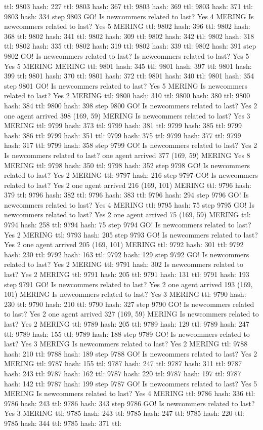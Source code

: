 ttl: 9803 hash: 227 ttl: 9803 hash: 367 ttl: 9803 hash: 369 ttl: 9803 hash: 371 ttl: 9803 hash: 334 step 9803 GO! Is newcommers related to last? Yes 4 MERING Is newcommers related to last? Yes 5 MERING ttl: 9802 hash: 396 ttl: 9802 hash: 368 ttl: 9802 hash: 341 ttl: 9802 hash: 309 ttl: 9802 hash: 342 ttl: 9802 hash: 318 ttl: 9802 hash: 335 ttl: 9802 hash: 319 ttl: 9802 hash: 339 ttl: 9802 hash: 391 step 9802 GO! Is newcommers related to last? Is newcommers related to last? Yes 5 Yes 5 MERING MERING ttl: 9801 hash: 345 ttl: 9801 hash: 397 ttl: 9801 hash: 399 ttl: 9801 hash: 370 ttl: 9801 hash: 372 ttl: 9801 hash: 340 ttl: 9801 hash: 354 step 9801 GO! Is newcommers related to last? Yes 5 MERING Is newcommers related to last? Yes 2 MERING ttl: 9800 hash: 310 ttl: 9800 hash: 380 ttl: 9800 hash: 384 ttl: 9800 hash: 398 step 9800 GO! Is newcommers related to last? Yes 2 one agent arrived 398 (169, 59) MERING Is newcommers related to last? Yes 3 MERING ttl: 9799 hash: 373 ttl: 9799 hash: 381 ttl: 9799 hash: 385 ttl: 9799 hash: 386 ttl: 9799 hash: 351 ttl: 9799 hash: 375 ttl: 9799 hash: 377 ttl: 9799 hash: 317 ttl: 9799 hash: 358 step 9799 GO! Is newcommers related to last? Yes 2 Is newcommers related to last? one agent arrived 377 (169, 59) MERING Yes 8 MERING ttl: 9798 hash: 350 ttl: 9798 hash: 352 step 9798 GO! Is newcommers related to last? Yes 2 MERING ttl: 9797 hash: 216 step 9797 GO! Is newcommers related to last? Yes 2 one agent arrived 216 (169, 101) MERING ttl: 9796 hash: 379 ttl: 9796 hash: 382 ttl: 9796 hash: 383 ttl: 9796 hash: 294 step 9796 GO! Is newcommers related to last? Yes 4 MERING ttl: 9795 hash: 75 step 9795 GO! Is newcommers related to last? Yes 2 one agent arrived 75 (169, 59) MERING ttl: 9794 hash: 258 ttl: 9794 hash: 75 step 9794 GO! Is newcommers related to last? Yes 2 MERING ttl: 9793 hash: 205 step 9793 GO! Is newcommers related to last? Yes 2 one agent arrived 205 (169, 101) MERING ttl: 9792 hash: 301 ttl: 9792 hash: 230 ttl: 9792 hash: 163 ttl: 9792 hash: 129 step 9792 GO! Is newcommers related to last? Yes 2 MERING ttl: 9791 hash: 302 Is newcommers related to last? Yes 2 MERING ttl: 9791 hash: 205 ttl: 9791 hash: 131 ttl: 9791 hash: 193 step 9791 GO! Is newcommers related to last? Yes 2 one agent arrived 193 (169, 101) MERING Is newcommers related to last? Yes 3 MERING ttl: 9790 hash: 230 ttl: 9790 hash: 210 ttl: 9790 hash: 327 step 9790 GO! Is newcommers related to last? Yes 2 one agent arrived 327 (169, 59) MERING Is newcommers related to last? Yes 2 MERING ttl: 9789 hash: 205 ttl: 9789 hash: 129 ttl: 9789 hash: 247 ttl: 9789 hash: 155 ttl: 9789 hash: 188 step 9789 GO! Is newcommers related to last? Yes 3 MERING Is newcommers related to last? Yes 2 MERING ttl: 9788 hash: 210 ttl: 9788 hash: 189 step 9788 GO! Is newcommers related to last? Yes 2 MERING ttl: 9787 hash: 155 ttl: 9787 hash: 247 ttl: 9787 hash: 311 ttl: 9787 hash: 243 ttl: 9787 hash: 162 ttl: 9787 hash: 220 ttl: 9787 hash: 197 ttl: 9787 hash: 142 ttl: 9787 hash: 199 step 9787 GO! Is newcommers related to last? Yes 5 MERING Is newcommers related to last? Yes 4 MERING ttl: 9786 hash: 336 ttl: 9786 hash: 243 ttl: 9786 hash: 343 step 9786 GO! Is newcommers related to last? Yes 3 MERING ttl: 9785 hash: 243 ttl: 9785 hash: 247 ttl: 9785 hash: 220 ttl: 9785 hash: 344 ttl: 9785 hash: 371 ttl: 